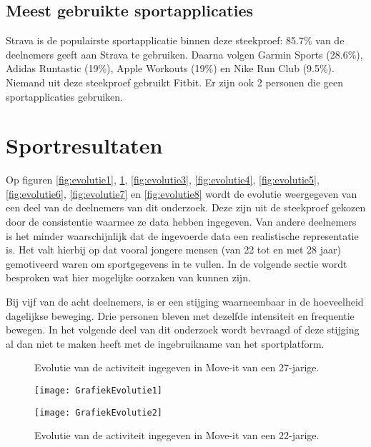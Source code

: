 \subsection{Meest gebruikte sportapplicaties}

Strava is de populairste sportapplicatie binnen deze steekproef: 85.7\% van de deelnemers geeft aan Strava te gebruiken. Daarna volgen Garmin Sports (28.6\%), Adidas Runtastic (19\%), Apple Workouts (19\%) en Nike Run Club (9.5\%). Niemand uit deze steekproef gebruikt Fitbit. Er zijn ook 2 personen die geen sportapplicaties gebruiken.

\section{Sportresultaten}

Op figuren \ref{fig:evolutie1}, \ref{fig:evolutie2}, \ref{fig:evolutie3}, \ref{fig:evolutie4}, \ref{fig:evolutie5}, \ref{fig:evolutie6}, \ref{fig:evolutie7} en \ref{fig:evolutie8} wordt de evolutie weergegeven van een deel van de deelnemers van dit onderzoek. Deze zijn uit de steekproef gekozen door de consistentie waarmee ze data hebben ingegeven. Van andere deelnemers is het minder waarschijnlijk dat de ingevoerde data een realistische representatie is. Het valt hierbij op dat vooral jongere mensen (van 22 tot en met 28 jaar) gemotiveerd waren om sportgegevens in te vullen. In de volgende sectie wordt besproken wat hier mogelijke oorzaken van kunnen zijn.

Bij vijf van de acht deelnemers, is er een stijging waarneembaar in de hoeveelheid dagelijkse beweging. Drie personen bleven met dezelfde intensiteit en frequentie bewegen. In het volgende deel van dit onderzoek wordt bevraagd of deze stijging al dan niet te maken heeft met de ingebruikname van het sportplatform.

\begin{figure}[htbp]
    \begin{minipage}[t]{0.48\linewidth} %
        \centering
        \caption[Evolutie van de activiteit van een 27-jarige]{Evolutie van de activiteit ingegeven in Move-it van een 27-jarige.}
        \texttt{[image: GrafiekEvolutie1]}
        \label{fig:evolutie1}
    \end{minipage}
    \hfill
    \begin{minipage}[t]{0.48\linewidth} %
        \centering
        \caption[Evolutie van de activiteit van een 22-jarige]{Evolutie van de activiteit ingegeven in Move-it van een 22-jarige.}
        \texttt{[image: GrafiekEvolutie2]}
        \label{fig:evolutie2}
    \end{minipage}
\end{figure}

